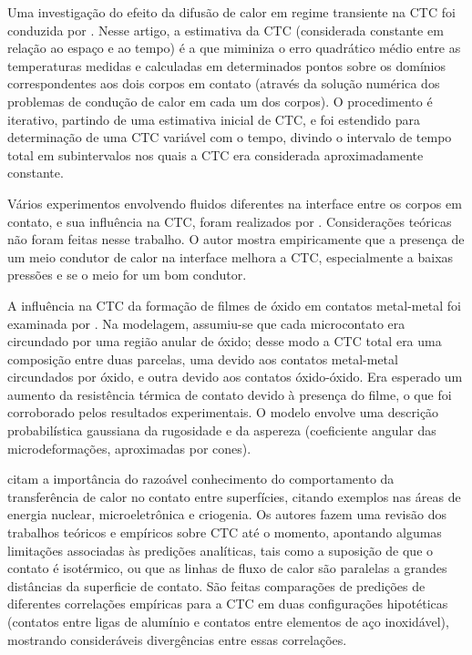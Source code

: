 Uma investigação do efeito da difusão de calor em regime transiente na CTC foi conduzida por \cite{artigo_beck}. Nesse artigo, a estimativa da CTC (considerada constante em relação ao espaço e ao tempo) é a que miminiza o erro quadrático médio entre as temperaturas medidas e calculadas em determinados pontos sobre os domínios correspondentes aos dois corpos em contato (através da solução numérica dos problemas de condução de calor em cada um dos corpos). O procedimento é iterativo, partindo de uma estimativa inicial de CTC, e foi estendido para determinação de uma CTC variável com o tempo, divindo o intervalo de tempo total em subintervalos nos quais a CTC era considerada aproximadamente constante.

Vários experimentos envolvendo fluidos diferentes na interface entre os corpos em contato, e sua influência na CTC, foram realizados por \cite{artigo_madhusudana}.
Considerações teóricas não foram feitas nesse trabalho. O autor mostra empiricamente que a presença de um meio condutor de calor na interface melhora a CTC,
especialmente a baixas pressões e se o meio for um bom condutor.   

A influência na CTC da formação de filmes de óxido em contatos metal-metal foi examinada por \cite{artigo_astrabadi}. Na modelagem, assumiu-se
que cada microcontato era circundado por uma região anular de óxido; desse modo a CTC total era uma composição entre duas parcelas, uma devido
aos contatos metal-metal circundados por óxido, e outra devido aos contatos óxido-óxido. Era esperado um aumento da resistência térmica de contato
devido à presença do filme, o que foi corroborado pelos resultados experimentais. O modelo envolve uma descrição probabilística gaussiana da rugosidade e
da aspereza (coeficiente angular das microdeformações, aproximadas por cones).

\cite{artigo_snaith} citam a importância do razoável conhecimento do comportamento da transferência de calor no contato entre superfícies, citando
exemplos nas áreas de energia nuclear, microeletrônica e criogenia. Os autores fazem uma revisão dos trabalhos teóricos e empíricos sobre CTC
até o momento, apontando algumas limitações associadas às predições analíticas, tais como a suposição de que o contato é isotérmico, ou que as linhas de fluxo
de calor são paralelas a grandes distâncias da superficie de contato. São feitas comparações de predições de diferentes correlações empíricas
para a CTC em duas configurações hipotéticas (contatos entre ligas de alumínio e contatos entre elementos de aço inoxidável), mostrando
consideráveis divergências entre essas correlações.

